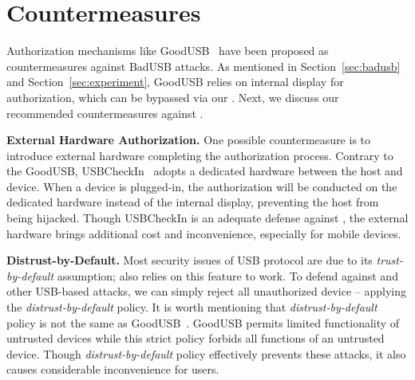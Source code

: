 \section{Countermeasures}
\label{sec:countermeasures}

Authorization mechanisms like GoodUSB~\cite{tian2015defending} have been
proposed as countermeasures against BadUSB attacks. As mentioned in
Section~\ref{sec:badusb} and Section~\ref{sec:experiment}, GoodUSB relies on
internal display for authorization, which can be bypassed via our \tool. 
Next, we discuss our recommended countermeasures against \tool.

\textbf{External Hardware Authorization.} One possible countermeasure is to
introduce external hardware completing the authorization process. Contrary to
the GoodUSB, USBCheckIn~\cite{usbcheckin} adopts a dedicated hardware between
the host and device. When a device is plugged-in, the authorization will be
conducted on the dedicated hardware instead of the internal display, preventing
the host from being hijacked. Though USBCheckIn is an adequate defense against
\tool, the external hardware brings additional cost and inconvenience,
especially for mobile devices.

\textbf{Distrust-by-Default.} Most security issues of USB protocol are due to
its \textit{trust-by-default} assumption; \tool also relies on this feature to work.
To defend against \tool and other USB-based attacks, we can simply reject all
{unauthorized} device -- applying the \textit{distrust-by-default} policy.  It
is worth mentioning that \textit{distrust-by-default} policy is not the same as
GoodUSB~\cite{tian2015defending}.  
GoodUSB permits limited functionality of untrusted devices while this strict policy forbids all functions of an untrusted device. Though \textit{distrust-by-default} policy effectively
prevents these attacks, it also causes considerable inconvenience for users.


